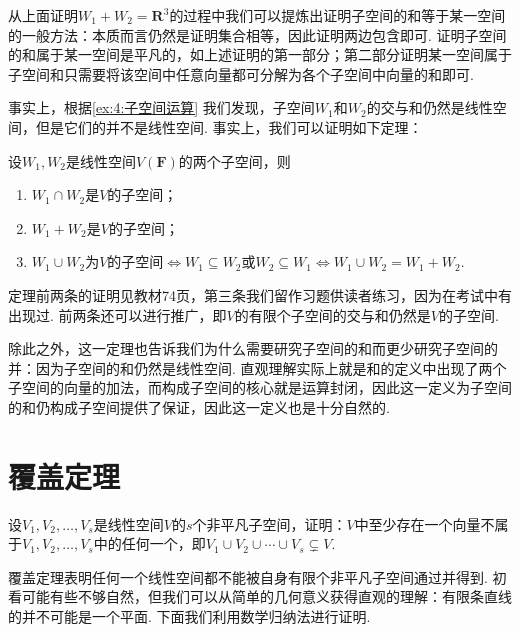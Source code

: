 从上面证明$W_1+W_2=\mathbf{R}^3$的过程中我们可以提炼出证明子空间的和等于某一空间的一般方法：本质而言仍然是证明集合相等，因此证明两边包含即可. 证明子空间的和属于某一空间是平凡的，如上述证明的第一部分；第二部分证明某一空间属于子空间和只需要将该空间中任意向量都可分解为各个子空间中向量的和即可.

事实上，根据\autoref{ex:4:子空间运算} 我们发现，子空间$W_1$和$W_2$的交与和仍然是线性空间，但是它们的并不是线性空间. 事实上，我们可以证明如下定理：
\begin{theorem}
    设$W_1,W_2$是线性空间$V(\mathbf{F})$的两个子空间，则
    \begin{enumerate}
        \item $W_1 \cap W_2$是$V$的子空间；

        \item $W_1 + W_2$是$V$的子空间；

        \item $W_1 \cup W_2$为$V$的子空间$\iff W_1 \subseteq W_2$或$W_2 \subseteq W_1 \iff W_1 \cup W_2=W_1+W_2$.
    \end{enumerate}
\end{theorem}

定理前两条的证明见教材74页，第三条我们留作习题供读者练习，因为在考试中有出现过. 前两条还可以进行推广，即$V$的有限个子空间的交与和仍然是$V$的子空间.

除此之外，这一定理也告诉我们为什么需要研究子空间的和而更少研究子空间的并：因为子空间的和仍然是线性空间. 直观理解实际上就是和的定义中出现了两个子空间的向量的加法，而构成子空间的核心就是运算封闭，因此这一定义为子空间的和仍构成子空间提供了保证，因此这一定义也是十分自然的.

\section{覆盖定理}

\begin{theorem}[覆盖定理] \label{thm:4:覆盖定理} 
    设$V_1,V_2,\ldots,V_s$是线性空间$V$的$s$个非平凡子空间，证明：$V$中至少存在一个向量不属于$V_1,V_2,\ldots,V_s$中的任何一个，即$V_1 \cup V_2 \cup \cdots \cup V_s\subsetneq V$.
\end{theorem}

覆盖定理表明任何一个线性空间都不能被自身有限个非平凡子空间通过并得到. 初看可能有些不够自然，但我们可以从简单的几何意义获得直观的理解：有限条直线的并不可能是一个平面. 下面我们利用数学归纳法进行证明.


